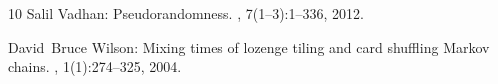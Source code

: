 \begin{thebibliography}{10}
{\sc Salil Vadhan}: Pseudorandomness.
, 7(1--3):1--336, 2012.
\newblock [\epfmtdoi{10.1561/0400000010}]

{\sc David~Bruce Wilson}: Mixing times of lozenge tiling and card shuffling
  {M}arkov chains.
, 1(1):274--325, 2004.

\end{thebibliography}